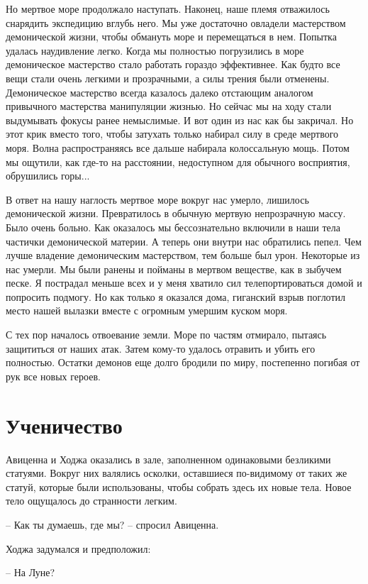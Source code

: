 \documentclass[12pt,a4paper]{article}
\begin{document}
Но мертвое море продолжало наступать. Наконец, наше племя отважилось снарядить экспедицию вглубь него. Мы уже достаточно овладели мастерством демонической жизни, чтобы обмануть море и перемещаться в нем. Попытка удалась наудивление легко. Когда мы полностью погрузились в море демоническое мастерство стало работать гораздо эффективнее. Как будто все вещи стали очень легкими и прозрачными, а силы трения были отменены. Демоническое мастерство всегда казалось далеко отстающим аналогом привычного мастерства манипуляции жизнью. Но сейчас мы на ходу стали выдумывать фокусы ранее немыслимые. И вот один из нас как бы закричал. Но этот крик вместо того, чтобы затухать только набирал силу в среде мертвого моря. Волна распространяясь все дальше набирала колоссальную мощь. Потом мы ощутили, как где-то на расстоянии, недоступном для обычного восприятия, обрушились горы...

В ответ на нашу наглость мертвое море вокруг нас умерло, лишилось демонической жизни. Превратилось в обычную мертвую непрозрачную массу. Было очень больно. Как оказалось мы бессознательно включили в наши тела частички демонической материи. А теперь они внутри нас обратились пепел. Чем лучше владение демоническим мастерством, тем больше был урон. Некоторые из нас умерли. Мы были ранены и пойманы в мертвом веществе, как в зыбучем песке. Я пострадал меньше всех и у меня хватило сил телепортироваться домой и попросить подмогу. Но как только я оказался дома, гиганский взрыв поглотил место нашей вылазки вместе с огромным умершим куском моря.

С тех пор началось отвоевание земли. Море по частям отмирало, пытаясь защититься от наших атак. Затем кому-то удалось отравить и убить его полностью. Остатки демонов еще долго бродили по миру, постепенно погибая от рук все новых героев.

\section*{Ученичество}

Авиценна и Ходжа оказались в зале, заполненном одинаковыми безликими статуями. Вокруг них валялись осколки, оставшиеся по-видимому от таких же статуй, которые были использованы, чтобы собрать здесь их новые тела. Новое тело ощущалось до странности легким.

-- Как ты думаешь, где мы? -- спросил Авиценна.

Ходжа задумался и предположил:

-- На Луне?
\end{document}
